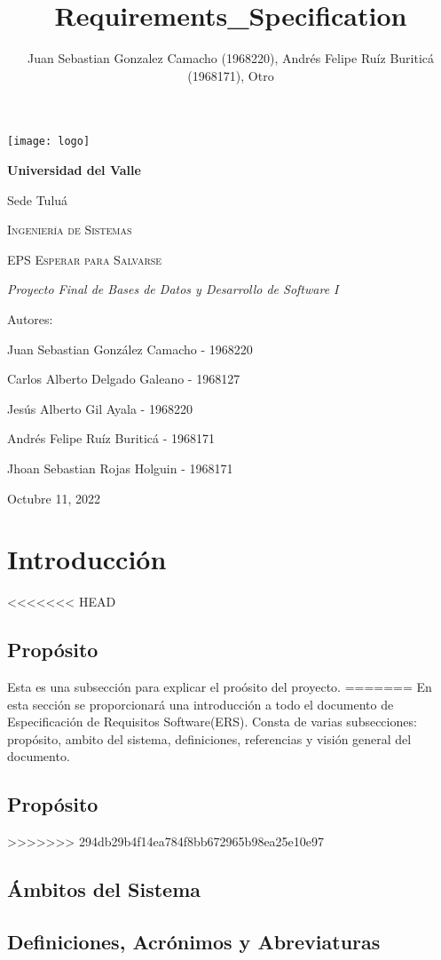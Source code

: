 \documentclass[12pt,a4paper]{article}
\author{Juan Sebastian Gonzalez Camacho (1968220), Andrés Felipe Ruíz Buriticá (1968171), Otro}
\title{Requirements_Specification}
\begin{document}
\begin{titlepage}
\centering
{\texttt{[image: logo]} \par}
\vfill
{\bfseries\LARGE Universidad del Valle\par}
{\Large Sede Tuluá\par}
\vfill
{\scshape\Large Ingeniería de Sistemas \par}
\vfill
{\scshape\Huge EPS Esperar para Salvarse \par}
\vfill
{\itshape\Large Proyecto Final de Bases de Datos y Desarrollo de Software I \par}
\vfill
{\Large Autores: \par}
{\Large Juan Sebastian González Camacho - 1968220 \par}
{\Large Carlos Alberto Delgado Galeano - 1968127 \par}
{\Large Jesús Alberto Gil Ayala - 1968220 \par}
{\Large Andrés Felipe Ruíz Buriticá - 1968171 \par}
{\Large Jhoan Sebastian Rojas Holguin - 1968171 \par}
\vfill
{\Large Octubre 11, 2022 \par}
\end{titlepage}
\tableofcontents
\newpage
\section{Introducción}
<<<<<<< HEAD

\subsection{Propósito}
Esta es una subsección para explicar el proósito del proyecto.
=======
En esta sección se proporcionará una introducción a todo el documento de Especificación de Requisitos Software(ERS). Consta de varias subsecciones: propósito, ambito del sistema, definiciones, referencias y visión general del documento.
\subsection{Propósito}
>>>>>>> 294db29b4f14ea784f8bb672965b98ea25e10e97
\subsection{Ámbitos del Sistema}
\subsection{Definiciones, Acrónimos y Abreviaturas}
\end{document}
